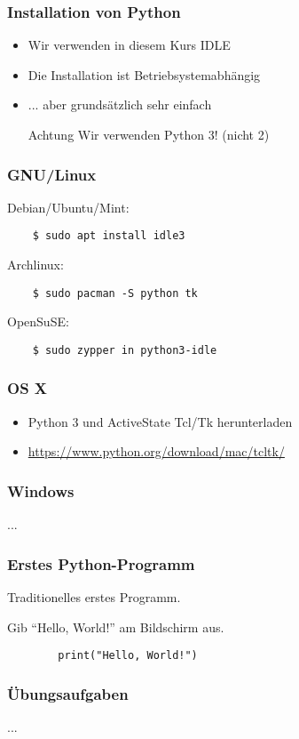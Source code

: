 \documentclass{beamer}
\begin{document}
\begin{frame}
\frametitle {Installation von Python}

\begin{itemize}
	\item Wir verwenden in diesem Kurs IDLE
	\item Die Installation ist Betriebsystemabhängig
	\item ... aber grundsätzlich sehr einfach

	\vspace*{1cm}
	\begin{alertblock}{Achtung}
		Wir verwenden Python 3! (nicht 2)
	\end{alertblock}
\end{itemize}
\end{frame}

\begin{frame}[fragile]%
\frametitle {GNU/Linux}

Debian/Ubuntu/Mint:

	\begin{verbatim}
	$ sudo apt install idle3
	\end{verbatim}

Archlinux:
	\begin{verbatim}
	$ sudo pacman -S python tk
	\end{verbatim}

OpenSuSE:
	\begin{verbatim}
	$ sudo zypper in python3-idle
	\end{verbatim}

\end{frame}

\begin{frame}
\frametitle{OS X}

	\begin{itemize}
		\item Python 3 und ActiveState Tcl/Tk herunterladen

		\item \url{https://www.python.org/download/mac/tcltk/}
	\end{itemize}

\end{frame}

\begin{frame}
	\frametitle{Windows}
	...
\end{frame}

\begin{frame}[fragile]
	\frametitle{Erstes Python-Programm}
	
	Traditionelles erstes Programm.

	Gib ``Hello, World!'' am Bildschirm aus.

	\vspace*{1cm}

	\begin{verbatim}
		print("Hello, World!")
	\end{verbatim}
\end{frame}

\begin{frame}
	\frametitle{Übungsaufgaben}
	...
\end{frame}
\end{document}
